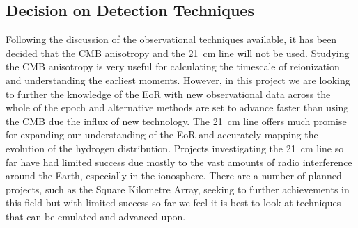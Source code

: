 
\subsection{Decision on Detection Techniques} %
\label{sec:decision_on_detection_techniques}
	Following the discussion of the observational techniques available, it has been decided that the CMB anisotropy and the \SI{21}{\centi\metre} line will not be used. Studying the CMB anisotropy is very useful for calculating the timescale of reionization and understanding the earliest moments. However, in this project we are looking to further the knowledge of the EoR with new observational data across the whole of the epoch and alternative methods are set to advance faster than using the CMB due the influx of new technology. The \SI{21}{\centi\metre} line offers much promise for expanding our understanding of the EoR and accurately mapping the evolution of the hydrogen distribution. Projects investigating the \SI{21}{\centi\metre} line so far have had limited success due mostly to the vast amounts of radio interference around the Earth, especially in the ionosphere. There are a number of planned projects, such as the Square Kilometre Array, seeking to further achievements in this field but with limited success so far we feel it is best to look at techniques that can be emulated and advanced upon.

